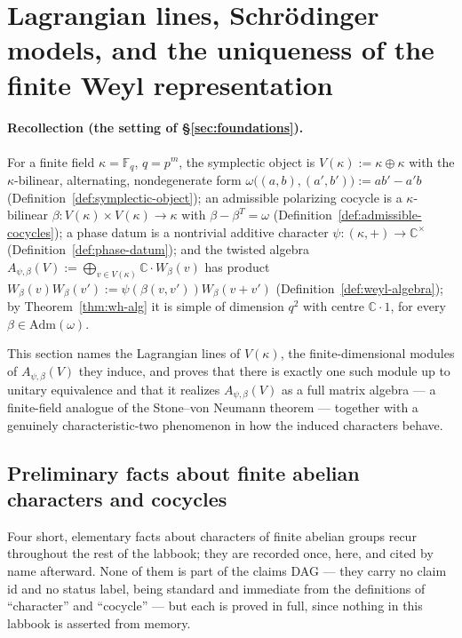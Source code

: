 \section{Lagrangian lines, Schr\"odinger models, and the uniqueness of the finite Weyl representation}
\label{sec:models}

\paragraph{Recollection (the setting of \S\ref{sec:foundations}).} For a
finite field $\kappa=\mathbb{F}_q$, $q=p^m$, the symplectic object is
$V(\kappa):=\kappa\oplus\kappa$ with the $\kappa$-bilinear, alternating,
nondegenerate form $\omega\big((a,b),(a',b')\big):=ab'-a'b$
(Definition~\ref{def:symplectic-object}); an admissible polarizing cocycle is
a $\kappa$-bilinear $\beta:V(\kappa)\times V(\kappa)\to\kappa$ with
$\beta-\beta^T=\omega$ (Definition~\ref{def:admissible-cocycles}); a phase
datum is a nontrivial additive character $\psi:(\kappa,+)\to\mathbb{C}^\times$
(Definition~\ref{def:phase-datum}); and the twisted algebra
$A_{\psi,\beta}(V):=\bigoplus_{v\in V(\kappa)}\mathbb{C}\cdot W_\beta(v)$ has
product $W_\beta(v)W_\beta(v'):=\psi(\beta(v,v'))W_\beta(v+v')$
(Definition~\ref{def:weyl-algebra}); by Theorem~\ref{thm:wh-alg} it is simple
of dimension $q^2$ with centre $\mathbb{C}\cdot 1$, for every
$\beta\in\mathrm{Adm}(\omega)$.

This section names the Lagrangian lines of $V(\kappa)$, the finite-dimensional
modules of $A_{\psi,\beta}(V)$ they induce, and proves that there is exactly
one such module up to unitary equivalence and that it realizes
$A_{\psi,\beta}(V)$ as a full matrix algebra — a finite-field analogue of the
Stone--von Neumann theorem — together with a genuinely characteristic-two
phenomenon in how the induced characters behave.

\subsection{Preliminary facts about finite abelian characters and cocycles}
\label{ssec:prelim-facts}

Four short, elementary facts about characters of finite abelian groups recur
throughout the rest of the labbook; they are recorded once, here, and cited
by name afterward. None of them is part of the claims DAG — they carry no
claim id and no status label, being standard and immediate from the
definitions of ``character'' and ``cocycle'' — but each is proved in full,
since nothing in this labbook is asserted from memory.

